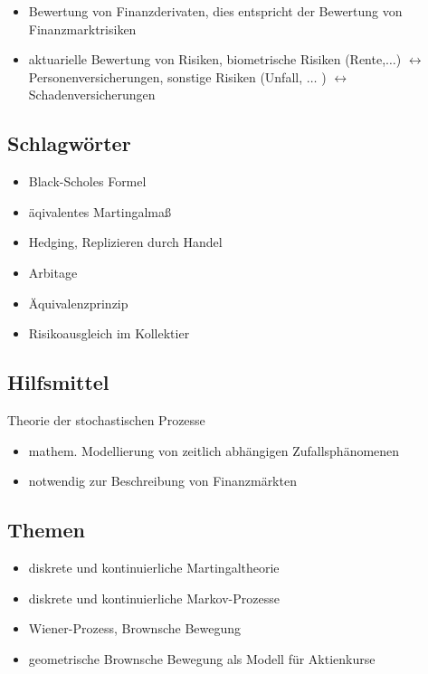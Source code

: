 \begin{itemize}
	\item Bewertung von Finanzderivaten, dies entspricht der Bewertung von Finanzmarktrisiken
	\item aktuarielle Bewertung von Risiken, biometrische Risiken (Rente,$\dots$) $\leftrightarrow$ Personenversicherungen,
		sonstige Risiken (Unfall, $\dots$ ) $\leftrightarrow$ Schadenversicherungen
\end{itemize}

\subsection*{Schlagwörter} %
\label{sub: schlagwörter}

\begin{itemize}
	\item Black-Scholes Formel
	\item äqivalentes Martingalmaß
	\item Hedging, Replizieren durch Handel
	\item Arbitage
	\item Äquivalenzprinzip
	\item Risikoausgleich im Kollektier
\end{itemize}

\subsection*{Hilfsmittel} %
\label{sub:hilfsmittel}

Theorie der stochastischen Prozesse
\begin{itemize}
	\item mathem. Modellierung von zeitlich abhängigen Zufallsphänomenen
	\item notwendig zur Beschreibung von Finanzmärkten
\end{itemize}

\subsection*{Themen} %
\label{sub: themen}

\begin{itemize}
	\item diskrete und kontinuierliche Martingaltheorie
	\item diskrete und kontinuierliche Markov-Prozesse
	\item Wiener-Prozess, Brownsche Bewegung
	\item geometrische Brownsche Bewegung als Modell für Aktienkurse
\end{itemize}

